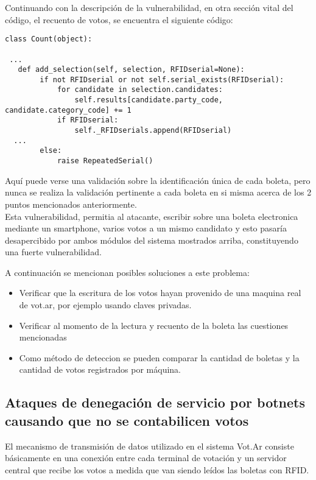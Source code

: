 Continuando con la descripción de la vulnerabilidad, en otra sección vital del código, el recuento de votos, se encuentra el siguiente código:

\begin{lstlisting}
class Count(object):

 ...
   def add_selection(self, selection, RFIDserial=None):
        if not RFIDserial or not self.serial_exists(RFIDserial):
            for candidate in selection.candidates:
                self.results[candidate.party_code, candidate.category_code] += 1
            if RFIDserial:
                self._RFIDserials.append(RFIDserial)
  ...
        else:
            raise RepeatedSerial()
\end{lstlisting}

Aquí puede verse una validación sobre la identificación única de cada boleta, pero nunca se realiza la validación pertinente a cada boleta en si misma acerca de los 2 puntos mencionados anteriormente.\\

Esta vulnerabilidad, permitia al atacante, escribir sobre una boleta electronica mediante un smartphone, varios votos a un mismo candidato y esto pasaría desapercibido por ambos módulos del sistema mostrados arriba, constituyendo una fuerte vulnerabilidad.

A continuación se mencionan posibles soluciones a este problema:

\begin{itemize}
	\item Verificar que la escritura de los votos hayan provenido de una maquina real de vot.ar, por ejemplo usando claves privadas.
	\item Verificar al momento de la lectura y recuento de la boleta las cuestiones mencionadas
	\item Como método de deteccion se pueden comparar la cantidad de boletas y la cantidad de votos registrados por máquina.
\end{itemize}


\subsection{Ataques de denegación de servicio por botnets causando que no se contabilicen votos}

El mecanismo de transmisión de datos utilizado en el sistema Vot.Ar consiste básicamente en una conexión entre cada terminal de votación y un servidor central que recibe los votos a medida que van siendo leídos las boletas con RFID. \\

